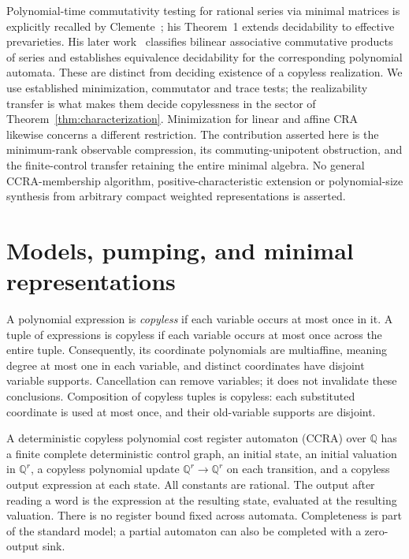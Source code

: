 \documentclass[acmlarge,screen,11pt,nonacm]{acmart}
\newcommand{\Q}{\mathbb{Q}}
\theoremstyle{definition}
\begin{document}
Polynomial-time commutativity testing for rational series via minimal matrices is explicitly recalled by Clemente~\cite[Introduction]{C25}; his Theorem~1 extends decidability to effective prevarieties. His later work~\cite{C26} classifies bilinear associative commutative products of series and establishes equivalence decidability for the corresponding polynomial automata. These are distinct from deciding existence of a copyless realization. We use established minimization, commutator and trace tests; the realizability transfer is what makes them decide copylessness in the sector of Theorem~\ref{thm:characterization}. Minimization for linear and affine CRA~\cite{BLR24} likewise concerns a different restriction. The contribution asserted here is the minimum-rank observable compression, its commuting-unipotent obstruction, and the finite-control transfer retaining the entire minimal algebra. No general CCRA-membership algorithm, positive-characteristic extension or polynomial-size synthesis from arbitrary compact weighted representations is asserted.

\section{Models, pumping, and minimal representations}\label{sec:prelim}
A polynomial expression is \emph{copyless} if each variable occurs at most once in it. A tuple of expressions is copyless if each variable occurs at most once across the entire tuple. Consequently, its coordinate polynomials are multiaffine, meaning degree at most one in each variable, and distinct coordinates have disjoint variable supports. Cancellation can remove variables; it does not invalidate these conclusions. Composition of copyless tuples is copyless: each substituted coordinate is used at most once, and their old-variable supports are disjoint.

A deterministic copyless polynomial cost register automaton (CCRA) over $\Q$ has a finite complete deterministic control graph, an initial state, an initial valuation in $\Q^r$, a copyless polynomial update $\Q^r\to\Q^r$ on each transition, and a copyless output expression at each state. All constants are rational. The output after reading a word is the expression at the resulting state, evaluated at the resulting valuation. There is no register bound fixed across automata. Completeness is part of the standard model; a partial automaton can also be completed with a zero-output sink.
\end{document}
